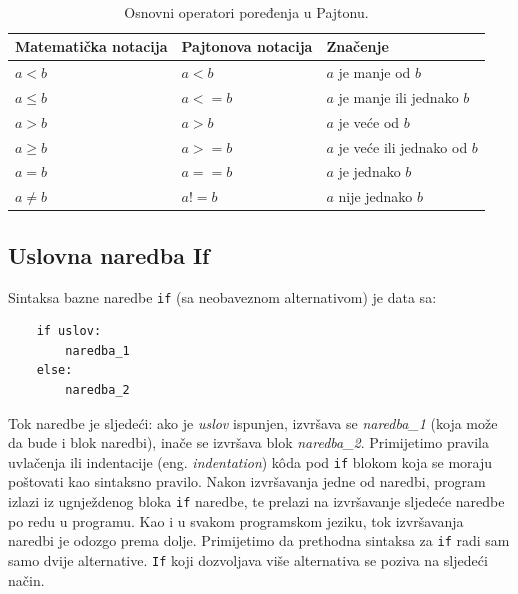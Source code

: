 
\begin{table}
		\caption{Osnovni operatori poređenja u Pajtonu.}	\label{fig: operatori_poredjenja}
~	\hline
	\begin{tabular}{lll}
		Matematička notacija & Pajtonova notacija & Značenje \\ \hline
		$a < b$              &  $a < b$           & $a$ je manje od $b$ \\
		 $a \leq b$          &  $a <= b$          &$ a$ je manje ili jednako $b$ \\  
		 $a > b$             &   $a >b$           & $a$ je veće od $b$   \\
		 $a \geq b$          &   $a >= b$         & $a$ je veće ili jednako od $b$   \\
		 $a=b$               &   $a==b$           & $a$ je jednako $b$               \\
		 $a \neq b$          & $a!=b$             &  $a$ nije jednako $b$            \\ \hline    
  	\end{tabular} 
\end{table}

\subsection{Uslovna naredba If}

Sintaksa bazne naredbe \texttt{if} (sa neobaveznom alternativom) je data sa:
\begin{verbatim}
    if uslov:
        naredba_1
    else:
        naredba_2
\end{verbatim}

Tok naredbe je sljedeći: ako je \emph{uslov} ispunjen, izvršava se \textit{naredba\_1} (koja može da bude i blok naredbi), inače se izvršava blok \textit{naredba\_2}. Primijetimo pravila uvlačenja ili indentacije (eng. \textit{indentation}) k\^oda pod \texttt{if} blokom koja se moraju poštovati kao sintaksno pravilo. Nakon izvršavanja jedne od naredbi, program izlazi iz ugnježdenog bloka \texttt{if} naredbe, te prelazi na izvršavanje sljedeće naredbe po redu u programu. Kao i u svakom programskom jeziku, tok izvršavanja naredbi je  odozgo prema dolje. Primijetimo da prethodna sintaksa za \texttt{if} radi sam samo dvije alternative. \texttt{If} koji dozvoljava više alternativa se poziva na sljedeći način. 

